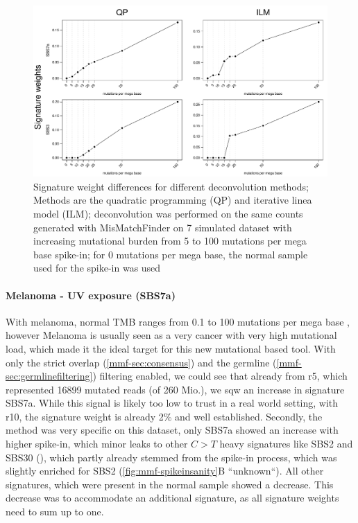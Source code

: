 \begin{figure}[ht]
\centering
\includegraphics[width=.99\linewidth]{Figures/MisMatchFinder/deconstructionMethodsDifferences.pdf}
\caption[Signature weight differences for different deconvolution methods]{Signature weight differences for different deconvolution methods; Methods are the quadratic programming (QP) and iterative linea model (ILM); deconvolution was performed on the same counts generated with MisMatchFinder on 7 simulated dataset with increasing mutational burden from 5 to 100 mutations per mega base spike-in; for 0 mutations per mega base, the normal sample used for the spike-in was used}\label{fig:mmf-methodDifferences}
\end{figure}


\paragraph{Melanoma - UV exposure (SBS7a)}
\label{mmf-sec:melaSim}

With melanoma, normal TMB ranges from 0.1 to 100 mutations per mega base \cite{Alexandrov2020}, however Melanoma is usually seen as a very cancer with very high mutational load, which made it the ideal target for this new mutational based tool. With only the strict overlap (\autoref{mmf-sec:consensus}) and the germline (\autoref{mmf-sec:germlinefiltering}) filtering enabled, we could see that already from r5, which represented 16899 mutated reads (of 260 Mio.), we sqw an increase in signature SBS7a. While this signal is likely too low to trust in a real world setting, with r10, the signature weight is already 2\% and well established. Secondly, the method was very specific on this dataset, only SBS7a showed an increase with higher spike-in, which minor leaks to other $C>T$ heavy signatures like SBS2 and SBS30 (), which partly already stemmed from the spike-in process, which was slightly enriched for SBS2 (\autoref{fig:mmf-spikeinsanity}B ``unknown``). All other signatures, which were present in the normal sample showed a decrease. This decrease was to accommodate an additional signature, as all signature weights need to sum up to one.


